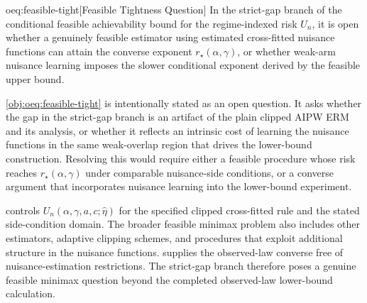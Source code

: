 \begin{definitionv}{oeq:feasible-tight}[Feasible Tightness Question]
In the strict-gap branch of the conditional feasible achievability bound for the regime-indexed risk \(U_n\), it is open whether a genuinely feasible estimator using estimated cross-fitted nuisance functions can attain the converse exponent \(r_\star(\alpha,\gamma)\), or whether weak-arm nuisance learning imposes the slower conditional exponent derived by the feasible upper bound.
\end{definitionv}

\cref{obj:oeq:feasible-tight} is intentionally stated as an open question.  It asks whether the gap in the strict-gap branch is an artifact of the plain clipped AIPW ERM and its analysis, or whether it reflects an intrinsic cost of learning the nuisance functions in the same weak-overlap region that drives the lower-bound construction.  Resolving this would require either a feasible procedure whose risk reaches \(r_\star(\alpha,\gamma)\) under comparable nuisance-side conditions, or a converse argument that incorporates nuisance learning into the lower-bound experiment.

 controls \(U_n(\alpha,\gamma,a,c;\widehat\eta)\) for the specified clipped cross-fitted rule and the stated side-condition domain.  The broader feasible minimax problem also includes other estimators, adaptive clipping schemes, and procedures that exploit additional structure in the nuisance functions.   supplies the observed-law converse free of nuisance-estimation restrictions.  The strict-gap branch therefore poses a genuine feasible minimax question beyond the completed observed-law lower-bound calculation.
